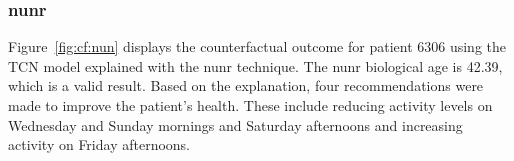\subsubsection{\gls{nunr}}
Figure~\ref{fig:cf:nun} displays the counterfactual outcome for patient $6306$ using the TCN model explained with the \gls{nunr} technique.
The \gls{nunr} biological age is 42.39, which is a valid result. Based on the explanation, four recommendations were made to improve the patient's health. These include reducing activity levels on Wednesday and Sunday mornings and Saturday afternoons and increasing activity on Friday afternoons.

